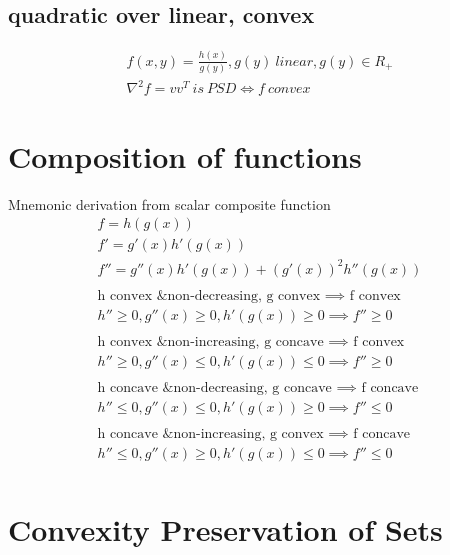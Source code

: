\documentclass[8pt]{report}
\begin{document}
\begin{multicols*}{2}
  \subsection{quadratic over linear, convex}
  \begin{align*}
    f(x,y) = \frac{h(x)}{g(y)}, g(y) \ linear, g(y) \in R_+\\
    \nabla^2 f = vv^T \ is\ PSD \iff f\ convex
  \end{align*}

  \vfill\null
  \columnbreak
  
  \section{Composition of functions}

  Mnemonic derivation from scalar composite function
  \begin{align*}
    f=h(g(x))\\
    f'=g'(x)h'(g(x))\\
    f''=g''(x)h'(g(x)) + (g'(x))^2 h''(g(x))\\
    \\
    \text{h convex \& non-decreasing, g convex } \implies \text{ f convex}\\
    h'' \geq 0, g''(x) \geq 0, h'(g(x)) \geq 0 \implies f'' \geq 0\\
    \\
    \text{h convex \& non-increasing, g concave } \implies \text{ f convex}\\
    h'' \geq 0, g''(x) \leq 0, h'(g(x)) \leq 0 \implies f'' \geq 0\\
    \\
    \text{h concave \& non-decreasing, g concave } \implies \text{ f concave}\\
    h'' \leq 0, g''(x) \leq 0, h'(g(x)) \geq 0 \implies f'' \leq 0\\
    \\
    \text{h concave \& non-increasing, g convex } \implies \text{ f concave}\\
    h'' \leq 0, g''(x) \geq 0, h'(g(x)) \leq 0 \implies f'' \leq 0\\
  \end{align*}

  \vfill\null
  
  \pagebreak
  
  \section{Convexity Preservation of Sets}

\end{multicols*}
\end{document}
